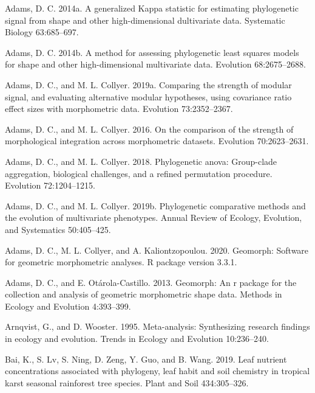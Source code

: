 \documentclass[
]{article}
\begin{document}
{\leavevmode\hypertarget{ref-Adams2014a}{}%
Adams, D. C. 2014a. A generalized Kappa statistic for estimating
phylogenetic signal from shape and other high-dimensional dultivariate
data. Systematic Biology 63:685--697.

\leavevmode\hypertarget{ref-Adams2014b}{}%
Adams, D. C. 2014b. A method for assessing phylogenetic least squares
models for shape and other high-dimensional multivariate data. Evolution
68:2675--2688.

\leavevmode\hypertarget{ref-AdamsCollyer2019b}{}%
Adams, D. C., and M. L. Collyer. 2019a. Comparing the strength of
modular signal, and evaluating alternative modular hypotheses, using
covariance ratio effect sizes with morphometric data. Evolution
73:2352--2367.

\leavevmode\hypertarget{ref-AdamsCollyer2016}{}%
Adams, D. C., and M. L. Collyer. 2016. On the comparison of the strength
of morphological integration across morphometric datasets. Evolution
70:2623--2631.

\leavevmode\hypertarget{ref-AdamsCollyer2018b}{}%
Adams, D. C., and M. L. Collyer. 2018. Phylogenetic anova: Group-clade
aggregation, biological challenges, and a refined permutation procedure.
Evolution 72:1204--1215.

\leavevmode\hypertarget{ref-AdamsCollyer2019}{}%
Adams, D. C., and M. L. Collyer. 2019b. Phylogenetic comparative methods
and the evolution of multivariate phenotypes. Annual Review of Ecology,
Evolution, and Systematics 50:405--425.

\leavevmode\hypertarget{ref-AdamsGeomorph}{}%
Adams, D. C., M. L. Collyer, and A. Kaliontzopoulou. 2020. Geomorph:
Software for geometric morphometric analyses. R package version 3.3.1.

\leavevmode\hypertarget{ref-AdamsOtarola2013}{}%
Adams, D. C., and E. Otárola-Castillo. 2013. Geomorph: An r package for
the collection and analysis of geometric morphometric shape data.
Methods in Ecology and Evolution 4:393--399.

\leavevmode\hypertarget{ref-Arnqvist1995}{}%
Arnqvist, G., and D. Wooster. 1995. Meta-analysis: Synthesizing research
findings in ecology and evolution. Trends in Ecology and Evolution
10:236--240.

\leavevmode\hypertarget{ref-Bai2019}{}%
Bai, K., S. Lv, S. Ning, D. Zeng, Y. Guo, and B. Wang. 2019. Leaf
nutrient concentrations associated with phylogeny, leaf habit and soil
chemistry in tropical karst seasonal rainforest tree species. Plant and
Soil 434:305--326.

}
\end{document}
